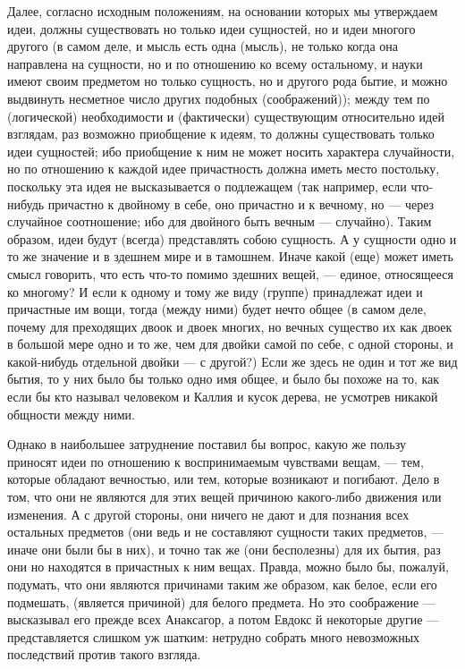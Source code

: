 \documentclass{article}
\begin{document}
Далее, согласно исходным положениям, на основании которых мы утверждаем идеи, должны существовать но только идеи сущностей, но и идеи многого другого (в самом деле, и мысль есть одна (мысль), не только когда она направлена на сущности, но и по отношению ко всему остальному, и науки имеют своим предметом но только сущность, но и другого рода бытие, и можно выдвинуть несметное число других подобных (соображений)); между тем по (логической) необходимости и (фактически) существующим относительно идей взглядам, раз возможно приобщение к идеям, то должны существовать только идеи сущностей; ибо приобщение к ним не может носить характера случайности, но по отношению к каждой идее причастность должна иметь место постольку, поскольку эта идея не высказывается о подлежащем
\footnotemark[10]
(так например, если что-нибудь причастно к двойному в себе,
\footnotemark[11]
оно причастно и к вечному, но --- через случайное соотношение; ибо для двойного быть вечным --- случайно). Таким образом, идеи будут (всегда) представлять собою сущность.
\footnotemark[12]
А у сущности одно и то же значение и в здешнем мире и в тамошнем. Иначе какой (еще) может иметь смысл говорить, что есть что-то помимо здешних вещей, --- единое, относящееся ко многому? И если к одному и тому же виду (группе) принадлежат идеи и причастные им вощи, тогда (между ними) будет нечто общее (в самом деле, почему для преходящих двоок и двоек многих, но вечных
\footnotemark[13]
существо их как двоек в большой мере одно и то же, чем для двойки самой по себе, с одной стороны, и какой-нибудь отдельной двойки --- с другой?) Если же здесь не один и тот же вид  бытия, то у них было бы только одно имя общее, и было бы похоже на то, как если бы кто называл человеком и Каллия и кусок дерева, не усмотрев никакой общности между ними.

Однако в наибольшее затруднение поставил бы вопрос, какую же пользу приносят идеи по отношению к воспринимаемым чувствами вещам, --- тем, которые обладают вечностью,
\footnotemark[14]
или тем, которые возникают и погибают. Дело в том, что они не являются для этих вещей причиною какого-либо движения или изменения. А с другой стороны, они ничего не дают и для познания всех остальных предметов (они ведь и не составляют сущности таких предметов, --- иначе они были бы в них), и точно так же (они бесполезны) для их бытия, раз они но находятся в причастных к ним вещах. Правда, можно было бы, пожалуй, подумать, что они являются причинами таким же образом, как белое, если его подмешать, (является причиной) для белого предмета. Но это соображение --- высказывал его прежде всех Анаксагор, а потом Евдокс й некоторые другие --- представляется слишком уж шатким: нетрудно собрать много невозможных последствий против такого взгляда.
\end{document}
